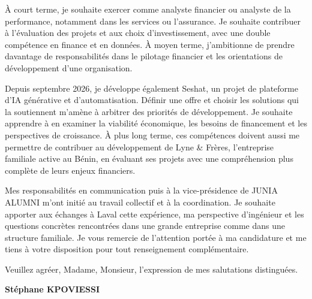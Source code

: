 \documentclass[12pt,a4paper]{article}
\begin{document}
À court terme, je souhaite exercer comme analyste financier ou analyste de la performance, notamment dans les services ou l'assurance. Je souhaite contribuer à l'évaluation des projets et aux choix d'investissement, avec une double compétence en finance et en données. À moyen terme, j'ambitionne de prendre davantage de responsabilités dans le pilotage financier et les orientations de développement d'une organisation.

Depuis septembre 2026, je développe également Seshat, un projet de plateforme d'IA générative et d'automatisation. Définir une offre et choisir les solutions qui la soutiennent m'amène à arbitrer des priorités de développement. Je souhaite apprendre à en examiner la viabilité économique, les besoins de financement et les perspectives de croissance. À plus long terme, ces compétences doivent aussi me permettre de contribuer au développement de Lyne \& Frères, l'entreprise familiale active au Bénin, en évaluant ses projets avec une compréhension plus complète de leurs enjeux financiers.

Mes responsabilités en communication puis à la vice-présidence de JUNIA ALUMNI m'ont initié au travail collectif et à la coordination. Je souhaite apporter aux échanges à Laval cette expérience, ma perspective d'ingénieur et les questions concrètes rencontrées dans une grande entreprise comme dans une structure familiale. Je vous remercie de l'attention portée à ma candidature et me tiens à votre disposition pour tout renseignement complémentaire.

Veuillez agréer, Madame, Monsieur, l'expression de mes salutations distinguées.

\vspace{0.5em}
\textbf{Stéphane KPOVIESSI}
\end{document}
